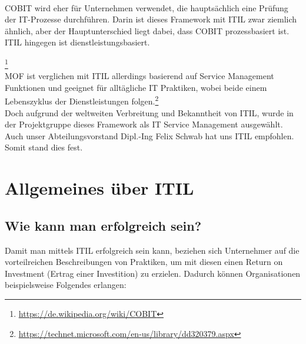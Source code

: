 \noindent
\\
COBIT wird eher für Unternehmen verwendet, die hauptsächlich
 eine Prüfung der IT-Prozesse durchführen. Darin ist dieses Framework mit ITIL zwar ziemlich
 ähnlich, aber der Hauptunterschied liegt dabei, dass COBIT prozessbasiert ist.
 ITIL hingegen ist dienstleistungsbasiert.{\footnote{\url{https://de.wikipedia.org/wiki/COBIT}}
\\
MOF ist verglichen mit ITIL allerdings basierend auf Service Management Funktionen
und geeignet für alltägliche IT Praktiken, wobei beide einem Lebenszyklus 
der Dienstleistungen folgen.\footnote{\url{https://technet.microsoft.com/en-us/library/dd320379.aspx}}
\\
Doch aufgrund der weltweiten Verbreitung und Bekanntheit von ITIL, wurde in der Projektgruppe 
dieses Framework als IT Service Management ausgewählt. Auch unser Abteilungsvorstand Dipl.-Ing 
Felix Schwab hat uns ITIL empfohlen. Somit stand dies fest.

\section{Allgemeines über ITIL}
\label{chap: ITIL im Detail}


\subsection{Wie kann man erfolgreich sein?}
Damit man mittels ITIL erfolgreich sein kann, beziehen sich Unternehmer auf die vorteilreichen Beschreibungen von Praktiken,
um mit diesen einen Return on Investment (Ertrag einer Investition) zu erzielen. Dadurch können Organisationen beispielsweise 
Folgendes erlangen:


\begin{quote}
\end{quote}

}
